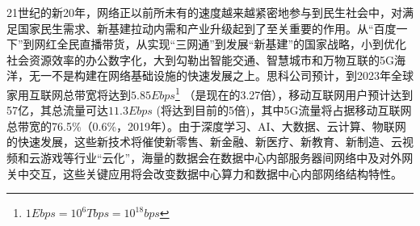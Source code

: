 






21世纪的新20年，网络正以前所未有的速度越来越紧密地参与到民生社会中，对满足国家民生需求、新基建拉动内需和产业升级起到了至关重要的作用。从“百度一下”到网红全民直播带货，从实现“三网通”到发展“新基建”的国家战略，小到优化社会资源效率的办公数字化，大到勾勒出智能交通、智慧城市和万物互联的5G海洋，无一不是构建在网络基础设施的快速发展之上。思科公司预计，到2023年全球家用互联网总带宽将达到$5.85Ebps$\footnote{$1 Ebps=10^6Tbps=10^{18}bps$} （是现在的3.27倍），移动互联网用户预计达到57亿，其总流量可达$11.3Ebps$ (将达到目前的5倍)，其中5G流量将占据移动互联网总带宽的76.5\%（0.6\%，2019年）。由于深度学习、AI、大数据、云计算、物联网的快速发展，这些新技术将催使新零售、新金融、新医疗、新教育、新制造、云视频和云游戏等行业“云化”，海量的数据会在数据中心内部服务器间网络中及对外网关中交互，这些关键应用将会改变数据中心算力和数据中心内部网络结构特性。

